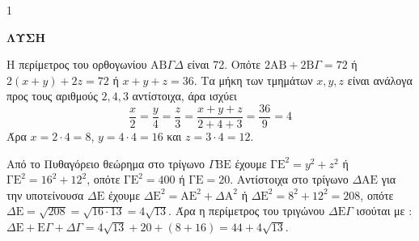 \begin{ylh}{1}
    \item [Ύλη από εικόνα]
\end{ylh}
\begin{figure}
    \centering
\end{figure}
{\notoserif\bfseries\normalsize ΛΥΣΗ}
\begin{alist}
    \item Η περίμετρος του ορθογωνίου $\mathrm{AB}\Gamma\Delta$ είναι 72. Οπότε $2 \mathrm{AB} + 2 \mathrm{B}\Gamma = 72$ ή $2 (x + y) + 2 z = 72$ ή $x + y + z = 36$. Τα μήκη των τμημάτων $x, y, z$ είναι ανάλογα προς τους αριθμούς $2,4,3$ αντίστοιχα, άρα ισχύει
    \[ \frac{x}{2} = \frac{y}{4} = \frac{z}{3} = \frac{x+y+z}{2+4+3} = \frac{36}{9} = 4 \]
    Άρα $x = 2 \cdot 4 = 8$, $y = 4 \cdot 4 = 16$ και $z = 3 \cdot 4 = 12$.
    \item Από το Πυθαγόρειο θεώρημα στο τρίγωνο $\Gamma\mathrm{BE}$ έχουμε $\mathrm{\Gamma E}^2 = y^2 + z^2$ ή $\mathrm{\Gamma E}^2 = 16^2 + 12^2$, οπότε $\mathrm{\Gamma E}^2 = 400$ ή $\mathrm{\Gamma E} = 20$. Αντίστοιχα στο τρίγωνο $\Delta \mathrm{AE}$ για την υποτείνουσα $\Delta \mathrm{E}$ έχουμε $\Delta \mathrm{E}^2 = \mathrm{AE}^2 + \Delta \mathrm{A}^2$ ή $\Delta \mathrm{E}^2 = 8^2 + 12^2 = 208$, οπότε $\Delta \mathrm{E} = \sqrt{208} = \sqrt{16 \cdot 13} = 4\sqrt{13}$. Άρα η περίμετρος του τριγώνου $\Delta \mathrm{E}\Gamma$ ισούται με : $\Delta \mathrm{E} + \mathrm{E}\Gamma + \Delta \Gamma = 4\sqrt{13} + 20 + (8+16) = 44 + 4\sqrt{13}$.
\end{alist}